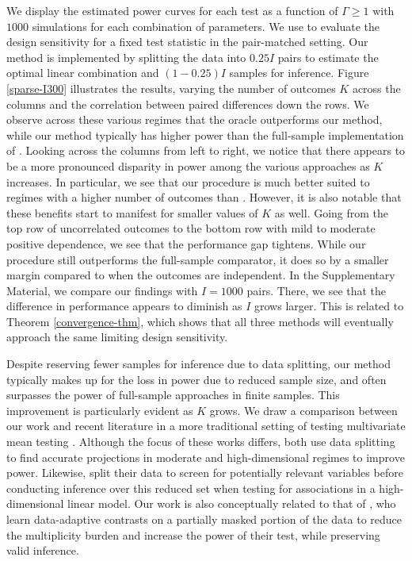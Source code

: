 \documentclass[12pt,leqno,titlepage]{amsart}
\newcommand{\1}{\mathbbm{1}}
\begin{document}
\begin{bibunit}
We display the estimated power curves for each test as a function of $\Gamma \geq 1$ with $1000$ simulations for each combination of parameters.
We use \cite[\S 4.1]{rosenbaum2016using} to evaluate the design sensitivity for a fixed test statistic in the pair-matched setting. Our method is implemented by splitting the data into $0.25I$ pairs to estimate the optimal linear combination and $(1-0.25)I$ samples for inference. %
Figure \ref{sparse-I300} illustrates the results, varying the number of outcomes $K$ across the columns and the correlation between paired differences down the rows. We observe across these various regimes that the oracle outperforms our method, while our method typically has higher power than the full-sample implementation of \cite{cohen2020multivariate}. Looking across the columns from left to right, we notice that there appears to be a more pronounced disparity in power among the various approaches as $K$ increases. In particular, we see that our procedure is much better suited to regimes with a higher number of outcomes than \cite{cohen2020multivariate}. However, it is also notable that these benefits start to manifest for smaller values of $K$ as well. Going from the top row of uncorrelated outcomes to the bottom row with mild to moderate positive dependence, we see that the performance gap tightens. While our procedure still outperforms the full-sample comparator, it does so by a smaller margin compared to when the outcomes are independent.
In the Supplementary Material, we compare our findings with $I=1000$ pairs. There, we see that the difference in performance appears to diminish as $I$ grows larger. This is related to Theorem \ref{convergence-thm}, which shows that all three methods will eventually approach the same limiting design sensitivity.

Despite reserving fewer samples for inference due to data splitting, our method typically makes up for the loss in power due to reduced sample size, and often surpasses the power of full-sample approaches in finite samples. This improvement is particularly evident as $K$ grows.
We draw a comparison between our work and recent literature in a more traditional setting of testing multivariate mean testing \citep{huang2015projection,liu2024projection}. Although the focus of these works differs, both use data splitting to find accurate projections in moderate and high-dimensional regimes to improve power. Likewise, \cite{barber2019knockoff} split their data to screen for potentially relevant variables before conducting inference over this reduced set when testing for associations in a high-dimensional linear model. Our work is also conceptually related to that of \cite{lei2018adapt}, who learn data-adaptive contrasts on a partially masked portion of the data to reduce the multiplicity burden and increase the power of their test, while preserving valid inference.







\end{bibunit}
\end{document}
